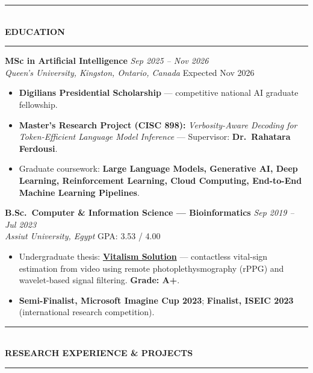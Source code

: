 \documentclass[10pt, a4paper]{article}
\newcommand{\cvsection}[1]{%
  \vspace{3pt}%
  {\color{navy}\rule{\linewidth}{1.1pt}}\\[0.5pt]%
  {\color{navy}\bfseries\fontsize{9.5}{11}\selectfont\uppercase{#1}}\\[-4pt]%
  {\color{teal}\rule{\linewidth}{0.6pt}}%
  \vspace{2pt}%
}
\newcommand{\cventry}[4]{%
  \vspace{2.5pt}%
  \textbf{\color{darkgray}#1} \hfill {\color{midgray}\textit{#3}}\\[-1.5pt]%
  {\color{teal}\textit{#2}} \hfill {\color{midgray}#4}%
}
\newenvironment{cvitems}{%
  \begin{itemize}[leftmargin=11pt, itemsep=0.5pt, parsep=0pt, topsep=1pt,
                  label={\textcolor{teal}{$\bullet$}}]
}{%
  \end{itemize}%
}
\begin{document}
\cvsection{Education}

\cventry{MSc in Artificial Intelligence}{Queen's University, Kingston, Ontario, Canada}
        {Sep 2025 -- Nov 2026}{Expected Nov 2026}
\begin{cvitems}
  \item \textbf{Digilians Presidential Scholarship} --- competitive national AI graduate fellowship.
  \item \textbf{Master's Research Project (CISC 898):} \textit{Verbosity-Aware Decoding for Token-Efficient Language Model Inference} --- Supervisor: \textbf{Dr.\ Rahatara Ferdousi}.
  \item Graduate coursework: \textbf{Large Language Models, Generative AI, Deep Learning, Reinforcement Learning, Cloud Computing, End-to-End Machine Learning Pipelines}.
\end{cvitems}

\cventry{B.Sc.\ Computer \& Information Science --- Bioinformatics}{Assiut University, Egypt}
        {Sep 2019 -- Jul 2023}{GPA: 3.53 / 4.00}
\begin{cvitems}
  \item Undergraduate thesis: \href{https://vitalismsolution.github.io/}{\textbf{Vitalism Solution}} --- contactless vital-sign estimation from video using remote photoplethysmography (rPPG) and wavelet-based signal filtering. \textbf{Grade: A+}.
  \item \textbf{Semi-Finalist, Microsoft Imagine Cup 2023}; \textbf{Finalist, ISEIC 2023} (international research competition).
\end{cvitems}

\cvsection{Research Experience \& Projects}
\end{document}
